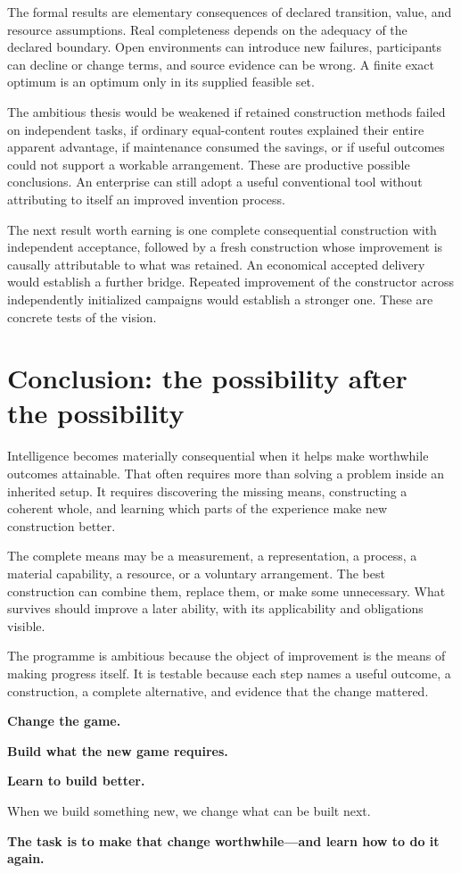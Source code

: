 The formal results are elementary consequences of declared transition, value, and resource assumptions. Real completeness depends on the adequacy of the declared boundary. Open environments can introduce new failures, participants can decline or change terms, and source evidence can be wrong. A finite exact optimum is an optimum only in its supplied feasible set.

The ambitious thesis would be weakened if retained construction methods failed on independent tasks, if ordinary equal-content routes explained their entire apparent advantage, if maintenance consumed the savings, or if useful outcomes could not support a workable arrangement. These are productive possible conclusions. An enterprise can still adopt a useful conventional tool without attributing to itself an improved invention process.

The next result worth earning is one complete consequential construction with independent acceptance, followed by a fresh construction whose improvement is causally attributable to what was retained. An economical accepted delivery would establish a further bridge. Repeated improvement of the constructor across independently initialized campaigns would establish a stronger one. These are concrete tests of the vision.

\clearpage
\section{Conclusion: the possibility after the possibility}

Intelligence becomes materially consequential when it helps make worthwhile outcomes attainable. That often requires more than solving a problem inside an inherited setup. It requires discovering the missing means, constructing a coherent whole, and learning which parts of the experience make new construction better.

The complete means may be a measurement, a representation, a process, a material capability, a resource, or a voluntary arrangement. The best construction can combine them, replace them, or make some unnecessary. What survives should improve a later ability, with its applicability and obligations visible.

The programme is ambitious because the object of improvement is the means of making progress itself. It is testable because each step names a useful outcome, a construction, a complete alternative, and evidence that the change mattered.

\begin{thesisbox}
{\Large\bfseries\color{Plum}Change the game.}\par
{\Large\bfseries\color{Plum}Build what the new game requires.}\par
{\Large\bfseries\color{Plum}Learn to build better.}\par\medskip
When we build something new, we change what can be built next.\par
\textbf{The task is to make that change worthwhile---and learn how to do it again.}
\end{thesisbox}

